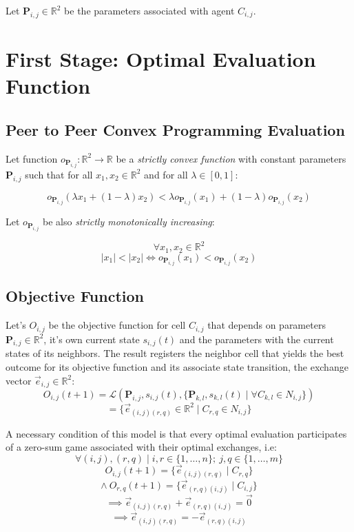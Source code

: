 \documentclass[12pt]{article}
\begin{document}
Let \(\mathbf{P}_{i,j} \in \mathbb{R}^2\) be the parameters associated with agent \(C_{i,j}\).
  
 \section{First Stage: Optimal Evaluation Function}
 
   \subsection{Peer to Peer Convex Programming Evaluation}
  
  Let function \( o_{\mathbf{P}_{i,j}}: \mathbb{R}^2 \to \mathbb{R} \) be a \textit{strictly convex function} with constant parameters \(\mathbf{P}_{i,j}\) such that for all \( x_1, x_2 \in \mathbb{R}^2 \) and for all \( \lambda \in [0, 1] \):

\[
o_{\mathbf{P}_{i,j}}(\lambda x_1 + (1 - \lambda) x_2) < \lambda o_{\mathbf{P}_{i,j}}(x_1) + (1 - \lambda) o_{\mathbf{P}_{i,j}}(x_2) \tag{3.1.1}
\]

Let \(o_{\mathbf{P}_{i,j}}\) be also \textit{strictly monotonically increasing}:

\[
\forall x_1, x_2 \in \mathbb{R}^2 
\]
\[
|x_1| < |x_2| 
\iff o_{\mathbf{P}_{i,j}}(x_1) < o_{\mathbf{P}_{i,j}}(x_2) \tag{3.1.2}
\]

 \subsection{Objective Function}
 
 Let's $O_{i,j}$ be the objective function for cell $C_{i,j}$ that depends on parameters $\mathbf{P}_{i,j} \in \mathbb{R}^{2}$, it's own current state $s_{i,j}(t)$ and the parameters with the current states of its neighbors. The result registers the neighbor cell that yields the best outcome for its objective function and its associate state transition, the exchange vector \(\vec{e}_{i,j} \in \mathbb{R}^{2}\):
  \[
  O_{i,j}(t+1) = \mathcal{L}\left(\mathbf{P}_{i,j},s_{i,j}(t), \{\mathbf{P}_{k,l},s_{k,l}(t) \mid \forall C_{k,l} \in N_{i,j}\}\right)
  \]
  \[
  = \{\vec{e}_{(i,j) (r,q)} \in \mathbb{R}^{2} \mid C_{r,q} \in N_{i,j}\}\tag{3.2.1}
  \]
  
  A necessary condition of this model is that every optimal evaluation participates of a zero-sum game associated with their optimal exchanges, i.e:\\
  \[
  \forall (i, j), (r,q) \mid i,r \in \{1, \dots, n\}; \ j, q \in \{1, \dots, m\}
  \]
  \[
  O_{i,j}(t+1) = \{\vec{e}_{(i,j) (r,q)} \mid C_{r,q}\}
  \]
  \[
  \land \ O_{r,q}(t+1) = \{\vec{e}_{(r,q) (i,j)} \mid C_{i,j}\}
  \]
  \[
    \implies \vec{e}_{(i,j) (r,q)} + \vec{e}_{(r,q) (i,j)} = \vec{0} \tag{3.2.2}
  \]
  \[
    \implies \vec{e}_{(i,j) (r,q)} = - \vec{e}_{(r,q) (i,j)} \tag{3.2.3}
  \]
  
\end{document}
